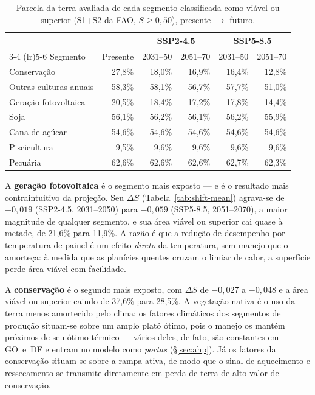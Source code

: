 \begin{table}[H]
\centering
\caption{Parcela da terra avaliada de cada segmento classificada como viável ou superior
(S1+S2 da FAO, $S \ge 0{,}50$), presente $\rightarrow$ futuro.}
\label{tab:shift-share}
\small
\begin{tabular}{@{}lrrrrr@{}}
\toprule
 & & \multicolumn{2}{c}{SSP2-4.5} & \multicolumn{2}{c}{SSP5-8.5} \\
\cmidrule(lr){3-4} \cmidrule(lr){5-6}
Segmento & Presente & 2031--50 & 2051--70 & 2031--50 & 2051--70 \\
\midrule
Conservação           & 27,8\% & 18,0\% & 16,9\% & 16,4\% & 12,8\% \\
Outras culturas anuais & 58,3\% & 58,1\% & 56,7\% & 57,7\% & 51,0\% \\
Geração fotovoltaica   & 20,5\% & 18,4\% & 17,2\% & 17,8\% & 14,4\% \\
Soja                   & 56,1\% & 56,2\% & 56,1\% & 56,2\% & 55,9\% \\
Cana-de-açúcar         & 54,6\% & 54,6\% & 54,6\% & 54,6\% & 54,6\% \\
Piscicultura           & 9,5\% & 9,6\% & 9,6\% & 9,6\% & 9,6\% \\
Pecuária               & 62,6\% & 62,6\% & 62,6\% & 62,7\% & 62,3\% \\
\bottomrule
\end{tabular}
\end{table}

A \textbf{geração fotovoltaica} é o segmento mais exposto --- e é o resultado mais contraintuitivo
da projeção. Seu $\Delta S$ (Tabela~\ref{tab:shift-mean}) agrava-se de $-0{,}019$ (SSP2-4.5,
2031--2050) para $-0{,}059$ (SSP5-8.5, 2051--2070), a maior magnitude de qualquer segmento, e
sua área viável ou superior cai quase à metade, de 21,6\% para 11,9\%. A razão é que a redução
de desempenho por temperatura de painel é um efeito \emph{direto} da temperatura, sem manejo
que o amorteça: à medida que as planícies quentes cruzam o limiar de calor, a superfície perde
área viável com facilidade.

A \textbf{conservação} é o segundo mais exposto, com $\Delta S$ de $-0{,}027$ a $-0{,}048$ e a
área viável ou superior caindo de 37,6\% para 28,5\%. A vegetação nativa é o uso da terra menos
amortecido pelo clima: os fatores climáticos dos segmentos de produção situam-se sobre um amplo
platô ótimo, pois o manejo os mantém próximos de seu ótimo térmico --- vários deles, de fato,
são constantes em GO~e~DF e entram no modelo como \emph{portas} (\S\ref{sec:ahp}). Já os
fatores da conservação situam-se sobre a rampa ativa, de modo que o sinal de aquecimento e
ressecamento se transmite diretamente em perda de terra de alto valor de conservação.

